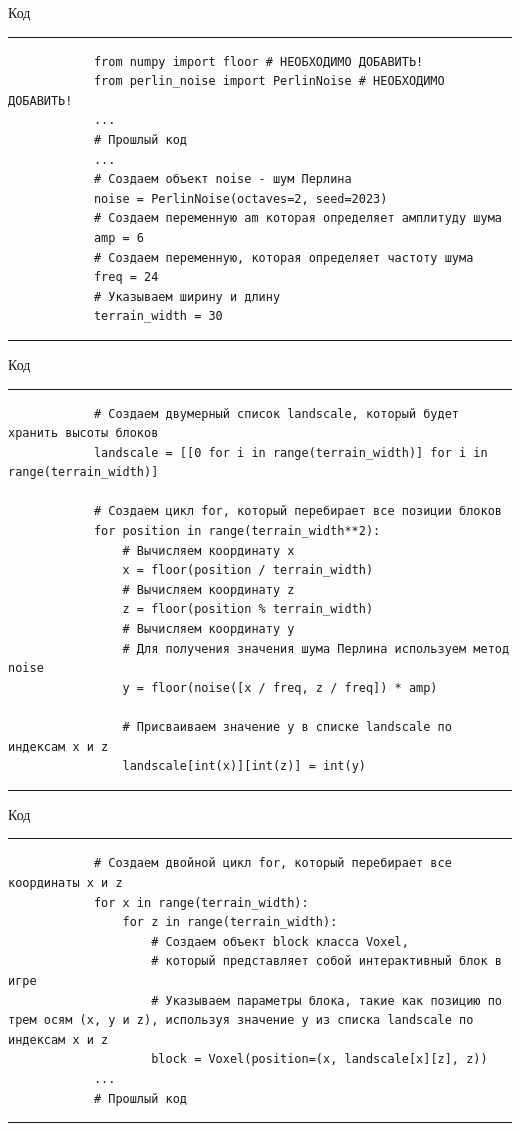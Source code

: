 \documentclass[handout]{beamer}
\begin{document}
    \begin{frame}[fragile]{Код}
        \scriptsize
        \rule{\textwidth}{1pt}
        \begin{verbatim}
            from numpy import floor # НЕОБХОДИМО ДОБАВИТЬ!
            from perlin_noise import PerlinNoise # НЕОБХОДИМО ДОБАВИТЬ!
            ...
            # Прошлый код
            ...
            # Создаем объект noise - шум Перлина
            noise = PerlinNoise(octaves=2, seed=2023)
            # Создаем переменную am которая определяет амплитуду шума
            amp = 6
            # Создаем переменную, которая определяет частоту шума
            freq = 24
            # Указываем ширину и длину 
            terrain_width = 30
        \end{verbatim}
        \rule{\textwidth}{1pt}
    \end{frame}

    \begin{frame}[fragile]{Код}
        \scriptsize
        \rule{\textwidth}{1pt}
        \begin{verbatim}
            # Создаем двумерный список landscale, который будет хранить высоты блоков
            landscale = [[0 for i in range(terrain_width)] for i in range(terrain_width)]
            
            # Создаем цикл for, который перебирает все позиции блоков
            for position in range(terrain_width**2):
                # Вычисляем координату x 
                x = floor(position / terrain_width)
                # Вычисляем координату z 
                z = floor(position % terrain_width)
                # Вычисляем координату y
                # Для получения значения шума Перлина используем метод noise
                y = floor(noise([x / freq, z / freq]) * amp)
            
                # Присваиваем значение y в списке landscale по индексам x и z
                landscale[int(x)][int(z)] = int(y)
        \end{verbatim}
        \rule{\textwidth}{1pt}
    \end{frame}


    \begin{frame}[fragile]{Код}
        \scriptsize
        \rule{\textwidth}{1pt}
        \begin{verbatim}
            # Создаем двойной цикл for, который перебирает все координаты x и z
            for x in range(terrain_width):
                for z in range(terrain_width):
                    # Создаем объект block класса Voxel, 
                    # который представляет собой интерактивный блок в игре
                    # Указываем параметры блока, такие как позицию по трем осям (x, y и z), используя значение y из списка landscale по индексам x и z
                    block = Voxel(position=(x, landscale[x][z], z))
            ...
            # Прошлый код
        \end{verbatim}
        \rule{\textwidth}{1pt}
    \end{frame}
\end{document}
